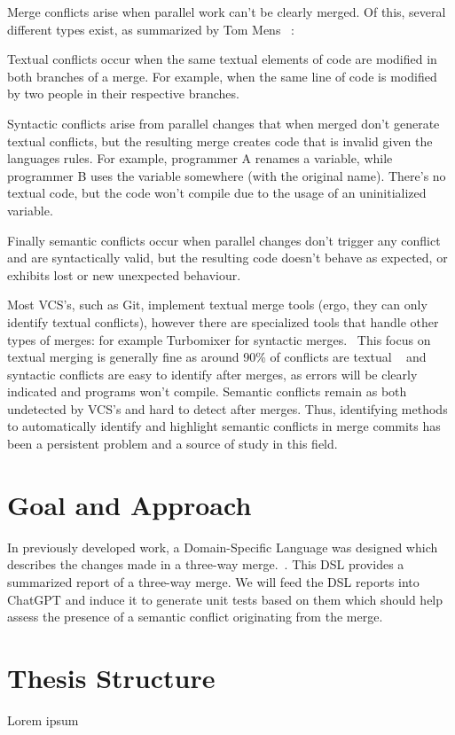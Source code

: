 Merge conflicts arise when parallel work can't be clearly merged. Of this, several different types exist, as summarized by Tom Mens ~\citep{kn:tmens}:

Textual conflicts occur when the same textual elements of code are modified in both branches of a merge. For example, when the same line of code is modified by two people in their respective branches.

Syntactic conflicts arise from parallel changes that when merged don't generate textual conflicts, but the resulting merge creates code that is invalid given the languages rules. For example, programmer A renames a variable, while programmer B uses the variable somewhere (with the original name). There's no textual code, but the code won't compile due to the usage of an uninitialized variable.

Finally semantic conflicts occur when parallel changes don't trigger any conflict and are syntactically valid, but the resulting code doesn't behave as expected, or exhibits lost or new unexpected behaviour.

Most VCS's, such as Git, implement textual merge tools (ergo, they can only identify textual conflicts), however there are specialized tools that handle other types of merges: for example Turbomixer for syntactic merges.~\citep{kn:tmens} This focus on textual merging is generally fine as around 90\% of conflicts are textual ~\citep{kn:lcsd} and syntactic conflicts are easy to identify after merges, as errors will be clearly indicated and programs won't compile.
Semantic conflicts remain as both undetected by VCS's and hard to detect after merges. Thus, identifying methods to automatically identify and highlight semantic conflicts in merge commits has been a persistent problem and a source of study in this field. ~\citep{kn:nuno} ~\citep{kn:leuson} ~\citep{kn:leuson2}



\section{Goal and Approach} \label{sec:approach}

In previously developed work, a Domain-Specific Language was designed which describes the changes made in a three-way merge.~\citep{kn:nuno}. This DSL provides a summarized report of a three-way merge. We will feed the DSL reports into ChatGPT and induce it to generate unit tests based on them which should help assess the presence of a semantic conflict originating from the merge.






\section{Thesis Structure} \label{sec:struct}


Lorem ipsum